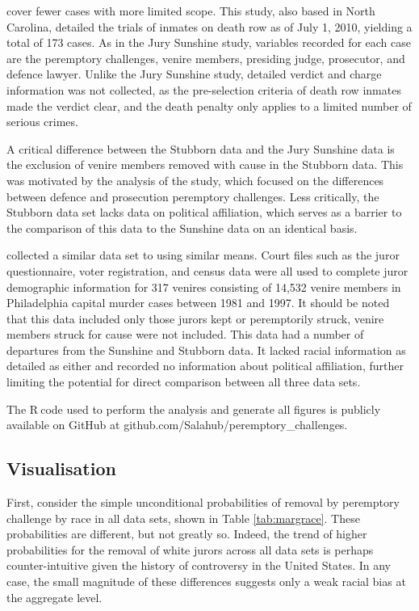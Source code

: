 \documentclass[12pt]{article}
\newcommand*{\R}{\textsf{R}$~$}
\begin{document}
\cite{StubbornLegacy} cover fewer cases with more limited scope. This study, also based in North Carolina, detailed the trials of inmates on death row as of July 1, 2010, yielding a total of 173 cases. As in the Jury Sunshine study, variables recorded for each case are the peremptory challenges, venire members, presiding judge, prosecutor, and defence lawyer. Unlike the Jury Sunshine study, detailed verdict and charge information was not collected, as the pre-selection criteria of death row inmates made the verdict clear, and the death penalty only applies to a limited number of serious crimes.

A critical difference between the Stubborn data and the Jury Sunshine data is the exclusion of venire members removed with cause in the Stubborn data. This was motivated by the analysis of the study, which focused on the differences between defence and prosecution peremptory challenges. Less critically, the Stubborn data set lacks data on political affiliation, which serves as a barrier to the comparison of this data to the Sunshine data on an identical basis.

\cite{PerempChalMurder} collected a similar data set to \cite{StubbornLegacy} using similar means. Court files such as the juror questionnaire, voter registration, and census data were all used to complete juror demographic information for 317 venires consisting of 14,532 venire members in Philadelphia capital murder cases between 1981 and 1997. It should be noted that this data included only those jurors kept or peremptorily struck, venire members struck for cause were not included. This data had a number of departures from the Sunshine and Stubborn data. It lacked racial information as detailed as either and recorded no information about political affiliation, further limiting the potential for direct comparison between all three data sets.

The \R code used to perform the analysis and generate all figures is publicly available on GitHub at github.com/Salahub/peremptory\_challenges.

\subsection{Visualisation}

First, consider the simple unconditional probabilities of removal by peremptory challenge by race in all data sets, shown in Table \ref{tab:margrace}. These probabilities are different, but not greatly so. Indeed, the trend of higher probabilities for the removal of white jurors across all data sets is perhaps counter-intuitive given the history of controversy in the United States. In any case, the small magnitude of these differences suggests only a weak racial bias at the aggregate level.
\end{document}
